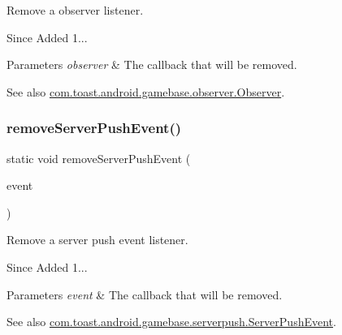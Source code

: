 Remove a observer listener. 

\begin{DoxySince}{Since}
Added 1... 
\end{DoxySince}

\begin{DoxyParams}{Parameters}
{\em observer} & The callback that will be removed. \\
\hline
\end{DoxyParams}
\begin{DoxySeeAlso}{See also}
\hyperlink{interfacecom_1_1toast_1_1android_1_1gamebase_1_1observer_1_1_observer}{com.\+toast.\+android.\+gamebase.\+observer.\+Observer}. 
\end{DoxySeeAlso}
\mbox{\label{classcom_1_1toast_1_1android_1_1gamebase_1_1_gamebase_a1aac5aefec7eee16ab9ca5522c19dd75}} 
\subsubsection{\texorpdfstring{remove\+Server\+Push\+Event()}{removeServerPushEvent()}}
{\footnotesize\ttfamily static void remove\+Server\+Push\+Event (\begin{DoxyParamCaption}\item[{\hyperlink{interfacecom_1_1toast_1_1android_1_1gamebase_1_1serverpush_1_1_server_push_event}{Server\+Push\+Event}}]{event }\end{DoxyParamCaption})\hspace{0.3cm}{\ttfamily [static]}}



Remove a server push event listener. 

\begin{DoxySince}{Since}
Added 1... 
\end{DoxySince}

\begin{DoxyParams}{Parameters}
{\em event} & The callback that will be removed. \\
\hline
\end{DoxyParams}
\begin{DoxySeeAlso}{See also}
\hyperlink{interfacecom_1_1toast_1_1android_1_1gamebase_1_1serverpush_1_1_server_push_event}{com.\+toast.\+android.\+gamebase.\+serverpush.\+Server\+Push\+Event}. 
\end{DoxySeeAlso}
\mbox{\label{classcom_1_1toast_1_1android_1_1gamebase_1_1_gamebase_a047d0d2590f3e4bb4933120ec6bc971d}} 
